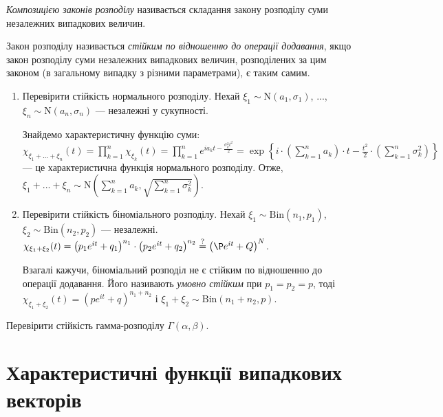 \begin{definition}
    \emph{Композицією законів розподілу} називається складання закону розподілу суми незалежних випадкових величин.
    
    Закон розподілу називається \emph{стійким по відношенню до операції додавання},
    якщо закон розподілу суми незалежних випадкових величин, розподілених за цим законом (в загальному випадку з різними параметрами),
    є таким самим.
\end{definition}
\begin{example}
    \begin{enumerate}
        \item Перевірити стійкість нормального розподілу. Нехай $\xi_1 \sim \mathrm{N}(a_1, \sigma_1)$, $...$, $\xi_n \sim \mathrm{N}(a_n, \sigma_n)$ ---
        незалежні у сукупності. 
    
        Знайдемо характеристичну функцію суми: $\chi_{\xi_1 + ... + \xi_n}(t) = \prod\limits_{k=1}^n \chi_{\xi_k}(t)=
        \prod\limits_{k=1}^n e^{ia_k t - \frac{\sigma_k^2 t^2}{2}} = 
        \exp\left\{i\cdot \left( \sum\limits_{k=1}^n a_k\right)\cdot t - \frac{t^2}{2}\cdot\left( \sum\limits_{k=1}^n \sigma_k^2\right)\right\}$ ---
        це характеристична функція нормального розподілу. Отже, $\xi_1 + ... + \xi_n \sim \mathrm{N}\left(\sum\limits_{k=1}^n a_k,  \sqrt{\sum\limits_{k=1}^n \sigma_k^2}\right)$.
        \item Перевірити стійкість біноміального розподілу. Нехай $\xi_1 \sim \mathrm{Bin}(n_1, p_1)$, $\xi_2 \sim \mathrm{Bin}(n_2, p_2)$ --- незалежні.
        $\chi_{\xi_1 + \xi_2} (t) = \left( p_1 e^{it} + q_1\right)^{n_1} \cdot \left( p_2 e^{it} + q_2\right)^{n_2} \overset{?}{=} \left(\P e^{it} + Q\right)^N$.

        Взагалі кажучи, біноміальний розподіл не є стійким по відношенню до  операції додавання.
        Його називають \emph{умовно стійким} при $p_1 = p_2 = p$, тоді
        $\chi_{\xi_1 + \xi_2} (t) = \left( p e^{it} + q\right)^{n_1 + n_2}$ і $\xi_1 + \xi_2 \sim \mathrm{Bin}(n_1+n_2, p)$.
    \end{enumerate}
\end{example}

\begin{exercise}
    Перевірити стійкість гамма-розподілу $\Gamma(\alpha, \beta)$.
\end{exercise}

\section{Характеристичні функції випадкових векторів}

